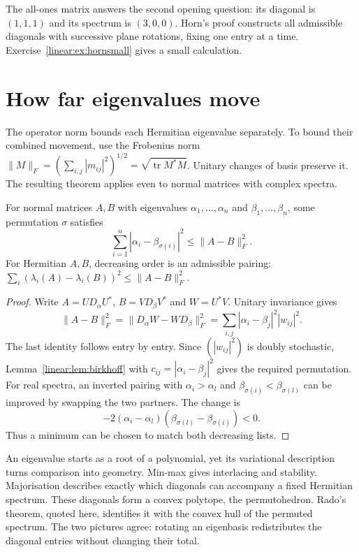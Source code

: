 The all-ones matrix answers the second opening question: its diagonal is $(1,1,1)$ and its spectrum is $(3,0,0)$. Horn's proof constructs all admissible diagonals with successive plane rotations, fixing one entry at a time. Exercise~\ref{linear:ex:hornsmall} gives a small calculation.

\section{How far eigenvalues move}

The operator norm bounds each Hermitian eigenvalue separately. To bound their combined movement, use the Frobenius norm $\|M\|_F=(\sum_{i,j}|m_{ij}|^2)^{1/2}=\sqrt{\operatorname{tr}M^*M}$. Unitary changes of basis preserve it. The resulting theorem applies even to normal matrices with complex spectra.

\begin{theorem}\label{linear:thm:hoffmanwielandt}
For normal matrices $A,B$ with eigenvalues $\alpha_1,\dots,\alpha_n$ and $\beta_1,\dots,\beta_n$, some permutation $\sigma$ satisfies
\[\sum_{i=1}^n|\alpha_i-\beta_{\sigma(i)}|^2\le\|A-B\|_F^2.\]
For Hermitian $A,B$, decreasing order is an admissible pairing: $\sum_i(\lambda_i(A)-\lambda_i(B))^2\le\|A-B\|_F^2$.
\end{theorem}
\begin{proof}
Write $A=UD_\alpha U^*$, $B=VD_\beta V^*$ and $W=U^*V$. Unitary invariance gives
\[\|A-B\|_F^2=\|D_\alpha W-WD_\beta\|_F^2=\sum_{i,j}|\alpha_i-\beta_j|^2|w_{ij}|^2.\]
The last identity follows entry by entry. Since $(|w_{ij}|^2)$ is doubly stochastic, Lemma~\ref{linear:lem:birkhoff} with $c_{ij}=|\alpha_i-\beta_j|^2$ gives the required permutation. For real spectra, an inverted pairing with $\alpha_i>\alpha_l$ and $\beta_{\sigma(i)}<\beta_{\sigma(l)}$ can be improved by swapping the two partners. The change is
\[-2(\alpha_i-\alpha_l)(\beta_{\sigma(l)}-\beta_{\sigma(i)})<0.\]
Thus a minimum can be chosen to match both decreasing lists.
\end{proof}

\begin{beauty}
An eigenvalue starts as a root of a polynomial, yet its variational description turns comparison into geometry. Min-max gives interlacing and stability. Majorisation describes exactly which diagonals can accompany a fixed Hermitian spectrum. These diagonals form a convex polytope, the permutohedron. Rado's theorem, quoted here, identifies it with the convex hull of the permuted spectrum. The two pictures agree: rotating an eigenbasis redistributes the diagonal entries without changing their total.
\end{beauty}

